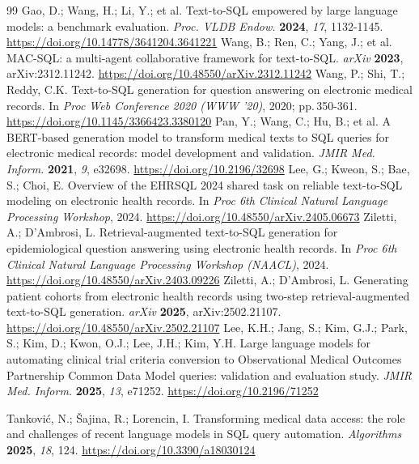 \documentclass[11pt,a4paper]{article}
\newcommand{\doilink}[1]{\begingroup\urlstyle{same}\url{#1}\endgroup}
\begin{document}
\begin{thebibliography}{99}
 Gao, D.; Wang, H.; Li, Y.; et al. Text-to-SQL empowered by large language models: a benchmark evaluation. \textit{Proc. VLDB Endow.} \textbf{2024}, \textit{17}, 1132-1145. \doilink{https://doi.org/10.14778/3641204.3641221}
 Wang, B.; Ren, C.; Yang, J.; et al. MAC-SQL: a multi-agent collaborative framework for text-to-SQL. \textit{arXiv} \textbf{2023}, arXiv:2312.11242. \doilink{https://doi.org/10.48550/arXiv.2312.11242}
 Wang, P.; Shi, T.; Reddy, C.K. Text-to-SQL generation for question answering on electronic medical records. In \textit{Proc Web Conference 2020 (WWW '20)}, 2020; pp.\,350-361. \doilink{https://doi.org/10.1145/3366423.3380120}
 Pan, Y.; Wang, C.; Hu, B.; et al. A BERT-based generation model to transform medical texts to SQL queries for electronic medical records: model development and validation. \textit{JMIR Med. Inform.} \textbf{2021}, \textit{9}, e32698. \doilink{https://doi.org/10.2196/32698}
 Lee, G.; Kweon, S.; Bae, S.; Choi, E. Overview of the EHRSQL 2024 shared task on reliable text-to-SQL modeling on electronic health records. In \textit{Proc 6th Clinical Natural Language Processing Workshop}, 2024. \doilink{https://doi.org/10.48550/arXiv.2405.06673}
 Ziletti, A.; D'Ambrosi, L. Retrieval-augmented text-to-SQL generation for epidemiological question answering using electronic health records. In \textit{Proc 6th Clinical Natural Language Processing Workshop (NAACL)}, 2024. \doilink{https://doi.org/10.48550/arXiv.2403.09226}
 Ziletti, A.; D'Ambrosi, L. Generating patient cohorts from electronic health records using two-step retrieval-augmented text-to-SQL generation. \textit{arXiv} \textbf{2025}, arXiv:2502.21107. \doilink{https://doi.org/10.48550/arXiv.2502.21107}
 Lee, K.H.; Jang, S.; Kim, G.J.; Park, S.; Kim, D.; Kwon, O.J.; Lee, J.H.; Kim, Y.H. Large language models for automating clinical trial criteria conversion to Observational Medical Outcomes Partnership Common Data Model queries: validation and evaluation study. \textit{JMIR Med. Inform.} \textbf{2025}, \textit{13}, e71252. \doilink{https://doi.org/10.2196/71252}

 Tankovi\'{c}, N.; \v{S}ajina, R.; Lorencin, I. Transforming medical data access: the role and challenges of recent language models in SQL query automation. \textit{Algorithms} \textbf{2025}, \textit{18}, 124. \doilink{https://doi.org/10.3390/a18030124}


\end{thebibliography}
\end{document}
